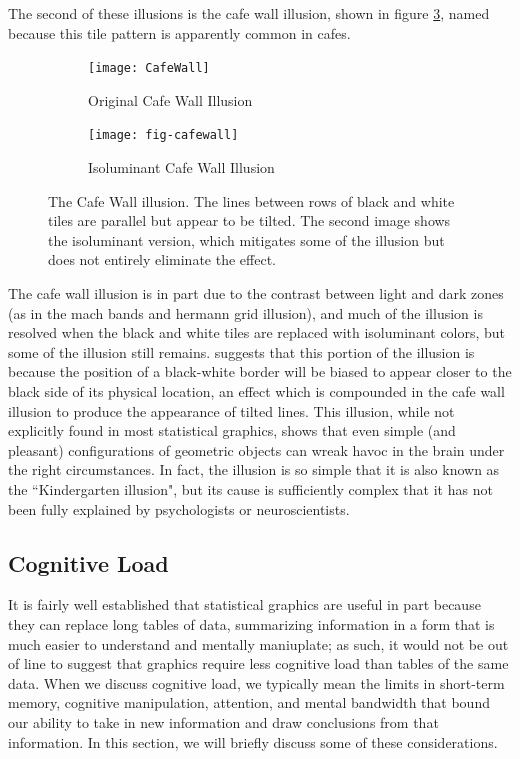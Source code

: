 \documentclass[11pt]{isuthesis}\usepackage[]{graphicx}\usepackage[]{color}
\begin{document}
The second of these illusions is the cafe wall illusion, shown in figure \ref{fig:cafewall}, named because this tile pattern is apparently common in cafes. 



\begin{figure}[htbp]\centering
\hfil
\begin{subfigure}[b]{.4\linewidth}\centering
  \texttt{[image: CafeWall]}
  \caption{Original Cafe Wall Illusion}\label{fig:CafeWallOrig}
\end{subfigure}\hfil
\begin{subfigure}[b]{.4\linewidth}\centering
  \texttt{[image: fig-cafewall]}
  \caption{Isoluminant Cafe Wall Illusion}\label{fig:CafeWallIso}
\end{subfigure}\hfil
\caption[Cafe Wall Illusion]{The Cafe Wall illusion. The lines between rows of black and white tiles are parallel but appear to be tilted. The second image shows the isoluminant version, which mitigates some of the illusion but does not entirely eliminate the effect.}\label{fig:cafewall}
\end{figure}

The cafe wall illusion is in part due to the contrast between light and dark zones (as in the mach bands and hermann grid illusion), and much of the illusion is resolved when the black and white tiles are replaced with isoluminant colors, but some of the illusion still remains. \citet{westheimer2007irradiation} suggests that this portion of the illusion is because the position of a black-white border will be biased to appear closer to the black side of its physical location, an effect which is compounded in the cafe wall illusion to produce the appearance of tilted lines. This illusion, while not explicitly found in most statistical graphics, shows that even simple (and pleasant) configurations of geometric objects can wreak havoc in the brain under the right circumstances. In fact, the illusion is so simple that it is also known as the ``Kindergarten illusion", but its cause is sufficiently complex that it has not been fully explained by psychologists or neuroscientists. 

\subsection{Cognitive Load}\label{cognitiveload}
It is fairly well established that statistical graphics are useful in part because they can replace long tables of data, summarizing information in a form that is much easier to understand and mentally maniuplate; as such, it would not be out of line to suggest that graphics require less cognitive load than tables of the same data. When we discuss cognitive load, we typically mean the limits in short-term memory, cognitive manipulation, attention, and mental bandwidth that bound our ability to take in new information and draw conclusions from that information. In this section, we will briefly discuss some of these considerations. 
\end{document}
